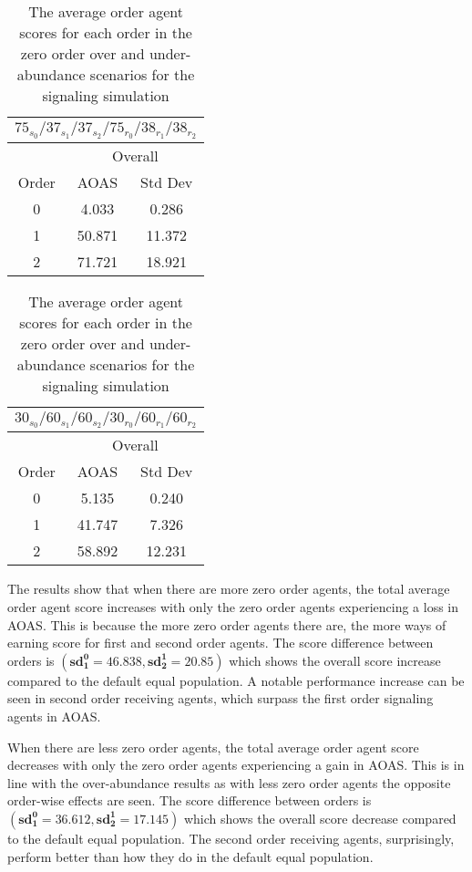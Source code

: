 \begin{table}[h]
    \centering
    \begin{tabular}{|c|c|c|}
    \hline
    \multicolumn{3}{|c|}{$75_{s_{0}}/37_{s_{1}}/37_{s_{2}}/75_{r_{0}}/38_{r_{1}}/38_{r_{2}}$} \\
    \hline
    \multicolumn{1}{|c|}{} & \multicolumn{2}{|c|}{Overall} \\
    \hline
    Order & AOAS & Std Dev \\
    \hline
    0     & 4.033   & 0.286    \\
    1     & 50.871  & 11.372   \\
    2     & 71.721  & 18.921   \\
    \hline
\end{tabular}
\qquad
\begin{tabular}{|c|c|c|}
    \hline
    \multicolumn{3}{|c|}{$30_{s_{0}}/60_{s_{1}}/60_{s_{2}}/30_{r_{0}}/60_{r_{1}}/60_{r_{2}}$} \\
    \hline
    \multicolumn{1}{|c|}{} & \multicolumn{2}{|c|}{Overall} \\
    \hline
    Order & AOAS & Std Dev \\
    \hline
    0     & 5.135   & 0.240    \\
    1     & 41.747  & 7.326   \\
    2     & 58.892  & 12.231   \\
    \hline
\end{tabular}
\caption{The average order agent scores for each order in the zero order over and under-abundance scenarios for the signaling simulation}
\label{table:sig-zero-order-overall}
\end{table}

The results show that when there are more zero order agents, the total average order agent score increases with only the zero order agents experiencing a loss in AOAS. This is because the more zero order agents there are, the more ways of earning score for first and second order agents. The score difference between orders is $(\mathbf{sd^0_1 = 46.838}, \mathbf{sd^1_2 = 20.85})$ which shows the overall score increase compared to the default equal population. A notable performance increase can be seen in second order receiving agents, which surpass the first order signaling agents in AOAS. 

When there are less zero order agents, the total average order agent score decreases with only the zero order agents experiencing a gain in AOAS. This is in line with the over-abundance results as with less zero order agents the opposite order-wise effects are seen. The score difference between orders is $(\mathbf{sd^0_1 = 36.612}, \mathbf{sd^1_2 = 17.145})$ which shows the overall score decrease compared to the default equal population. The second order receiving agents, surprisingly, perform better than how they do in the default equal population. 

